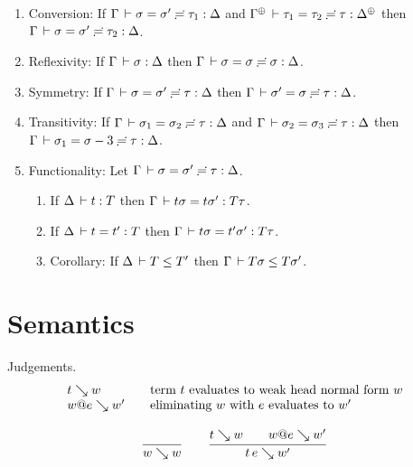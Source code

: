 \documentclass[acmlarge,review,anonymous]{acmart}\settopmatter{printfolios=true}
\begin{document}
\begin{lemma}
\label{lem:subeq}\bla
\begin{enumerate}
\item Conversion: If\/ $\Gamma \,\vdash \sigma = \sigma' \risingdotseq \tau_1 : \Delta$ and $\sueq {\resurrect\Gamma} {\tau_1} {\tau_2} {\tau} {\resurrect\Delta}$ then $\Gamma \,\vdash \sigma = \sigma' \risingdotseq \tau_2 : \Delta$.
\item Reflexivity: If\/ $\Gamma \,\vdash \sigma : \Delta$ then $\Gamma \,\vdash \sigma = \sigma \risingdotseq \sigma : \Delta$.
\item Symmetry:  If\/ $\Gamma \,\vdash \sigma = \sigma' \risingdotseq \tau : \Delta$ then $\Gamma \,\vdash \sigma' = \sigma \risingdotseq \tau : \Delta$.
\item Transitivity:  If\/ $\Gamma \,\vdash \sigma_1 = \sigma_2 \risingdotseq \tau : \Delta$ and $\Gamma \,\vdash \sigma_2 = \sigma_3 \risingdotseq \tau : \Delta$ then $\Gamma \,\vdash \sigma_1 = \sigma-3 \risingdotseq \tau : \Delta$.
\item Functionality: Let $\Gamma \,\vdash \sigma = \sigma' \risingdotseq \tau : \Delta$.
  \begin{enumerate}
  \item
  If $\Delta \,\vdash t : T$ then $\Gamma \,\vdash t\sigma = t\sigma' : T\tau$.
  \item
  If $\Delta \,\vdash t = t' : T$ then $\Gamma \,\vdash t\sigma = t'\sigma' : T\tau$.
  \item
  Corollary: If $\Delta \,\vdash T \leq T'$ then $\Gamma \,\vdash T\sigma \leq T\sigma'$.
  \end{enumerate}
\end{enumerate}
\end{lemma}





\section{Semantics}
\label{sec:sem}


Judgements.
\[
\begin{array}{l@{\qquad}l}
  t \evalsto w & \mbox{term $t$ evaluates to weak head normal form $w$} \\
  w @ e \evalsto w' & \mbox{eliminating $w$ with $e$ evaluates to $w'$} \\
\end{array}
\]

\begin{gather*}
  \ru{}{w \evalsto w}
\qquad
  \ru{t \evalsto w \qquad w @ e \evalsto w'}{t\,e \evalsto w'}
\end{gather*}
\end{document}
